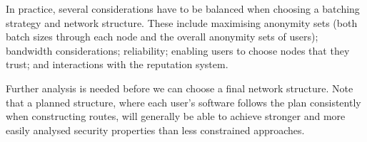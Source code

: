 \documentclass{llncs}
\begin{document}
In practice, several considerations have to be balanced when choosing
a batching strategy and network structure. These include maximising
anonymity sets (both batch sizes through each node and the overall
anonymity sets of users); bandwidth considerations; reliability;
enabling users to choose nodes that they trust; and interactions with
the reputation system.

Further analysis is needed before we can choose a
final network structure. Note that a planned structure, where each
user's software follows the plan consistently when constructing
routes, will generally be able to achieve stronger and more easily
analysed security properties than less constrained approaches.


\end{document}

